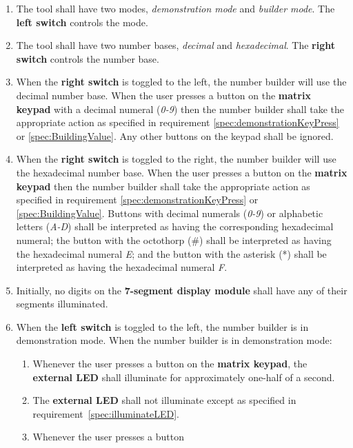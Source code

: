 \begin{enumerate}
\item The tool shall have two modes, \textit{demonstration mode} and
    \textit{builder mode}. The \textbf{left switch} controls the mode.
\item The tool shall have two number bases, \textit{decimal} and
    \textit{hexadecimal}. The \textbf{right switch} controls the number base.
\item \label{spec:decimalExplained} When the \textbf{right switch} is toggled
    to the left, the number builder will use the decimal number base. When the
    user presses a button on the \textbf{matrix keypad} with a decimal numeral
    (\textit{0-9}) then the number builder shall take the appropriate action as
    specified in requirement \ref{spec:demonstrationKeyPress} or
    \ref{spec:BuildingValue}. Any other buttons on the keypad shall be ignored.
\item \label{spec:hexadecimalExplained} When the \textbf{right switch} is
    toggled to the right, the number builder will use the hexadecimal number
    base. When the user presses a button on the \textbf{matrix keypad} then the
    number builder shall take the appropriate action as specified in
    requirement \ref{spec:demonstrationKeyPress} or \ref{spec:BuildingValue}.
    Buttons with decimal numerals (\textit{0-9}) or alphabetic letters
    (\textit{A-D}) shall be interpreted as having the corresponding hexadecimal
    numeral; the button with the octothorp (\#) shall be interpreted as having
    the hexadecimal numeral \textit{E}; and the button with the asterisk (*)
    shall be interpreted as having the hexadecimal numeral \textit{F}.
\item Initially, no digits on the \textbf{7-segment display module} shall have
    any of their segments illuminated.
\item When the \textbf{left switch} is toggled to the left, the number builder
    is in demonstration mode. When the number builder is in demonstration mode:
    \begin{enumerate}
    \item \label{spec:illuminateLED} Whenever the user presses a button on the
        \textbf{matrix keypad}, the \textbf{external LED} shall illuminate for
        approximately one-half of a second.
    \item The \textbf{external LED} shall not illuminate except as specified in
        requirement~\ref{spec:illuminateLED}.
    \item \label{spec:demonstrationKeyPress} Whenever the user presses a button

\end{enumerate}
\end{enumerate}
